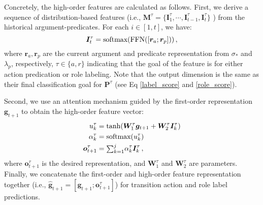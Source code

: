 \documentclass[letterpaper]{article} \usepackage{aaai21}  \usepackage{times}  \usepackage{helvet} \usepackage{courier}  \usepackage[hyphens]{url}  \usepackage{graphicx} \urlstyle{rm} \def\UrlFont{\rm}  \usepackage{natbib}  \usepackage{caption}
\begin{document}
\begin{CJK}{UTF8}{gbsn}
Concretely, the high-order features are calculated as follows.
First, we derive a sequence of distribution-based features (i.e., $\bm{M}^{\tau}=\{\bm{I}^{\tau}_1,\cdots,\bm{I}^{\tau}_{t-1},\bm{I}^{\tau}_{t}\}$ ) from the historical argument-predicates.
For each $i \in [1, t]$, we have:
\begin{equation}
\setlength\abovedisplayskip{3pt}
\setlength\belowdisplayskip{3pt}
    \bm{I}^{\tau}_t = \text{softmax}(\text{FFN}([ \bm{r}_a ; \bm{r}_p])) \,,
\end{equation}
where $\bm{r}_a, \bm{r}_p$ are the current argument and predicate representation from $\sigma_{*}$ and $\lambda_p$, respectively,
${\tau}\in\{a, r\}$ indicating that the goal of the feature is for either action predication or role labeling.
Note that the output dimension is the same as their final classification goal for $\bm{P}^{\tau}$ (see Eq \ref{label_score} and \ref{role_score}).

Second, we use an attention mechanism guided by the first-order representation $\bm{g}_{t+1}$ to obtain the high-order feature vector:
\begin{equation}
\setlength\abovedisplayskip{3pt}
\setlength\belowdisplayskip{3pt}
\begin{split}
    u^{\tau}_k &= \text{tanh}(\bm{W}^{\tau}_1 \bm{g}_{t+1} + \bm{W}^{\tau}_2 \bm{I}^{\tau}_{k} ) \\
    \alpha^{\tau}_k &= \text{softmax}(u^{\tau}_k) \\
    \bm{o}^{\tau}_{t+1} &=  \begin{matrix} \sum_{k=1}^j \end{matrix} \alpha^{\tau}_k \bm{I}^{\tau}_{k} \,,
\end{split}
\end{equation}
where $\bm{o}^{\tau}_{t+1}$ is the desired representation, and $\bm{W}^{\tau}_1$ and  $\bm{W}^{\tau}_2$ are parameters.
Finally, we concatenate the first-order and high-order feature representation together (i.e., $\hat{\bm{g}}_{t+1} = [\bm{g}_{t+1}; \bm{o}^{\tau}_{t+1}]$) for transition action and role label predictions.  






\end{CJK}
\end{document}
